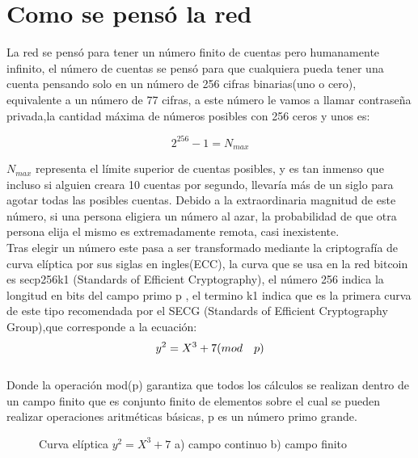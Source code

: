 \documentclass{rbf}
\begin{document}
\section{Como se pensó la red}

La red se pensó para tener un número  finito de cuentas pero humanamente infinito, el número de cuentas se pensó para que cualquiera pueda tener una cuenta pensando solo en un número de 256 cifras binarias(uno o cero), equivalente a un número de 77 cifras, a este número le vamos a llamar contraseña privada,la cantidad máxima de números posibles con 256 ceros y unos es: 

\begin{equation}
    2^{256} -1= N_{max}
\end{equation}


$N_{max}$ representa el límite superior de cuentas posibles, y es tan inmenso que incluso si alguien creara 10 cuentas por segundo, llevaría más de un siglo para agotar todas las posibles cuentas. Debido a la extraordinaria magnitud de este número, si una persona eligiera un número al azar, la probabilidad de que otra persona elija el mismo es extremadamente remota, casi inexistente.
\\
Tras elegir un número este pasa a ser transformado mediante la criptografía de curva elíptica por sus siglas en ingles(ECC), la curva que se usa en la red bitcoin es secp256k1 (Standards of Efficient Cryptography), el número 256 indica la longitud en bits del campo primo p , el termino k1 indica que es la primera curva de este tipo recomendada por el SECG (Standards of Efficient Cryptography Group),que corresponde a la ecuación:
\\
\begin{equation}
    \centering
    y^{2} = X^{3}+7(mod \quad p)
\end{equation}
\\
Donde la operación mod(p) garantiza que todos los cálculos se realizan dentro de un campo finito que es conjunto finito de elementos sobre el cual se pueden realizar operaciones aritméticas básicas, p es un número primo grande.
\\
\begin{figure} [h]
  \hspace{1cm}
    
 \caption{Curva elíptica $y^{2} = X^{3}+7$  a) campo continuo  b)  campo finito }
 
\end{figure}
\end{document}
